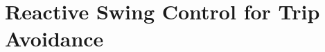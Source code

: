 \chapter{Reactive Swing Control for Trip Avoidance}\label{sec:trip_avoidance}

\graphicspath{{chapters/trip_avoidance/figures/}}






